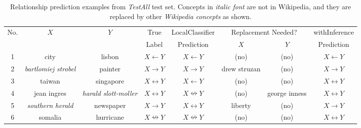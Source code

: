 {  \begin{table}[!t]
    \small
    \begin{center}
      \begin{tabular}{|c|c|c|c|c|c|c|c|}
        \hline
        No.  &  $X$             &  $Y$          &  True    &  LocalClassifier       &  \multicolumn{2}{|c|}{Replacement Needed?}  &  withInference \\ \cline{6-7}
        &                  &               &  Label   &  Prediction                   &  $X$                  &  $Y$                     &  Prediction           \\
        \hline
        \hline
        1&city                    &lisbon                   &$X \leftarrow Y$      &$X \leftarrow Y$      &(no)        &(no)         &$X \leftarrow Y$  \\
        2&{\em bartlomiej strobel}&painter                  &$X \rightarrow Y$     &$X \rightarrow Y$     &drew struzan&(no)         &$X \rightarrow Y$ \\
        3&taiwan                  &singapore                &$X \leftrightarrow Y$ &$X \leftarrow Y$               &(no)        &(no)         &$X \leftrightarrow Y$ \\
        4&jean ingres             &{\em harald slott-moller}&$X \leftrightarrow Y$ &$X \nleftrightarrow Y$         &(no)        &george inness&$X \leftrightarrow Y$ \\
        5&{\em southern herald}   &newspaper                &$X \rightarrow Y$     &$X \leftrightarrow Y$          &liberty     &(no)         &$X \rightarrow Y$  \\
        6&somalia                 &hurricane                &$X \nleftrightarrow Y$&$X \nleftrightarrow Y$&(no)        &(no)         &$X \leftrightarrow Y$  \\
        \hline
      \end{tabular}
      \caption{Relationship prediction examples from {\em TestAll}
        test set. Concepts in {\em italic font} are not in Wikipedia,
        and they are replaced by other {\em Wikipedia concepts} as
        shown.}
      \label{table:pre-examples}
    \end{center}
  \end{table}
}

